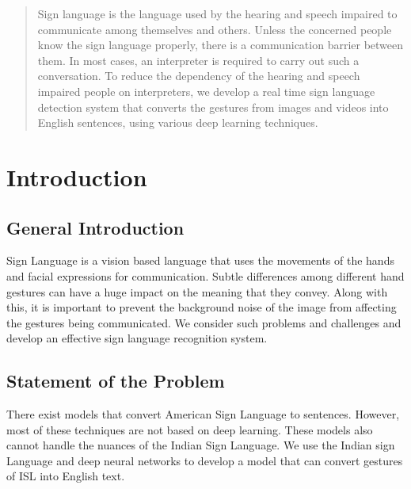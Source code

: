 \documentclass[12pt,oneside,a4paper]{article}
\providecommand\phantomsection{}
\begin{document}
	\null
	\vspace{\fill}

	\phantomsection
	\begin{abstract}
		\normalsize
		\doublespacing
		Sign language is the language used by the hearing and speech impaired to communicate among themselves and others. Unless the concerned people know the sign language properly, there is a communication barrier between them. In most cases, an interpreter is required to carry out such a conversation. To reduce the dependency of the hearing and speech impaired people on interpreters, we develop a real time sign language detection system that converts the gestures from images and videos into English sentences, using various deep learning techniques.
	\end{abstract}

	\vspace{\fill}
	\null
	\newpage

	\tableofcontents

	\newpage

	\section{Introduction}

		\subsection{General Introduction}
			Sign Language is a vision based language that uses the movements of the hands and facial expressions for communication. Subtle differences among different hand gestures can have a huge impact on the meaning that they convey. Along with this, it is important to prevent the background noise of the image from affecting the gestures being communicated. We consider such problems and challenges and develop an effective sign language recognition system.

		\subsection{Statement of the Problem}
			There exist models that convert American Sign Language to sentences. However, most of these techniques are not based on deep learning. These models also cannot handle the nuances of the Indian Sign Language. We use the Indian sign Language and deep neural networks to develop a model that can convert gestures of ISL into English text.
\end{document}
